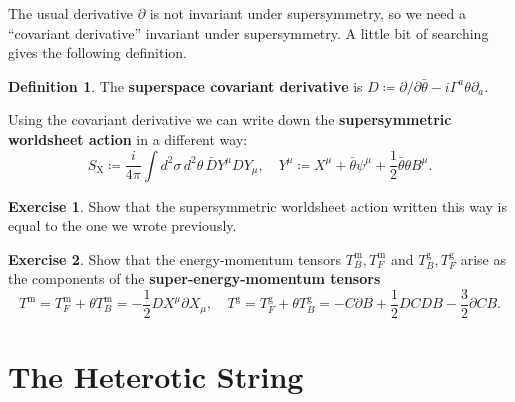 \documentclass{report}
\theoremstyle{plain}
\theoremstyle{definition}
\newtheorem{definition}[theorem]{Definition}
\newtheorem{exercise}{Exercise}[section]
\theoremstyle{remark}
\newcommand{\di}{\partial}
\begin{document}
The usual derivative $\di$ is not invariant under supersymmetry, so we
need a ``covariant derivative'' invariant under supersymmetry. A
little bit of searching gives the following definition.

\begin{definition}
  The {\bf superspace covariant derivative} is $D \coloneqq
  \di/\di \bar{\theta} - i \Gamma^a \theta \di_a$.
\end{definition}

Using the covariant derivative we can write down the {\bf
  supersymmetric worldsheet action} in a different way:
\[ S_{\text{X}} \coloneqq \frac{i}{4\pi} \int d^2\sigma \, d^2\theta \, \bar{D}Y^\mu DY_\mu, \quad Y^\mu \coloneqq X^\mu + \bar{\theta} \psi^\mu + \frac{1}{2} \bar{\theta} \theta B^\mu. \]

\begin{exercise}
  Show that the supersymmetric worldsheet action written this way is
  equal to the one we wrote previously.
\end{exercise}

\begin{exercise}
  Show that the energy-momentum tensors $T_B^{\text{m}},
  T_F^{\text{m}}$ and $T_B^{\text{g}}, T_F^{\text{g}}$ arise as the
  components of the {\bf super-energy-momentum tensors}
  \[ T^{\text{m}} = T_F^{\text{m}} + \theta T_B^{\text{m}} = -\frac{1}{2} DX^\mu \di X_\mu, \quad T^{\text{g}} = T_F^{\text{g}} + \theta T_B^{\text{g}} = -C \di B + \frac{1}{2} DC DB - \frac{3}{2} \di C B. \]
\end{exercise}

\section{The Heterotic String}
\end{document}
